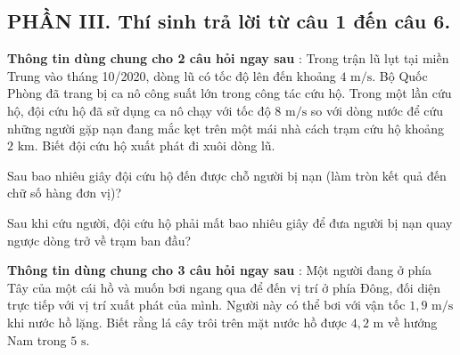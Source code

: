 \subsection*{PHẦN III. Thí sinh trả lời từ câu 1 đến câu 6.}

\noindent\textbf{Thông tin dùng chung cho 2 câu hỏi ngay sau} : Trong trận lũ lụt tại miền Trung vào tháng 10/2020, dòng lũ có tốc độ lên đến khoảng $4\text{ m/s}$. Bộ Quốc Phòng đã trang bị ca nô công suất lớn trong công tác cứu hộ. Trong một lần cứu hộ, đội cứu hộ đã sử dụng ca nô chạy với tốc độ $8\text{ m/s}$ so với dòng nước để cứu những người gặp nạn đang mắc kẹt trên một mái nhà cách trạm cứu hộ khoảng $2\text{ km}$. Biết đội cứu hộ xuất phát đi xuôi dòng lũ.

\begin{ex}
Sau bao nhiêu giây đội cứu hộ đến được chỗ người bị nạn (làm tròn kết quả đến chữ số hàng đơn vị)?

\par{}
\end{ex}

\begin{ex}
Sau khi cứu người, đội cứu hộ phải mất bao nhiêu giây để đưa người bị nạn quay ngược dòng trở về trạm ban đầu?

\par{}
\end{ex}

\noindent\textbf{Thông tin dùng chung cho 3 câu hỏi ngay sau} : Một người đang ở phía Tây của một cái hồ và muốn bơi ngang qua để đến vị trí ở phía Đông, đối diện trực tiếp với vị trí xuất phát của mình. Người này có thể bơi với vận tốc $1{,}9\text{ m/s}$ khi nước hồ lặng. Biết rằng lá cây trôi trên mặt nước hồ được $4{,}2\text{ m}$ về hướng Nam trong $5\text{ s}$.


